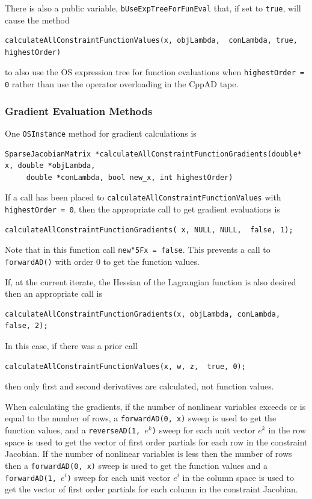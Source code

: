 \documentclass[11pt]{article}
\renewcommand{\_}{{\char"5F}}
\renewcommand{\{}{{\char"7B}}
\renewcommand{\}}{{\char"7D}}
\renewcommand{\^}{{\char"0D}}
\renewcommand{\'}{{\char"0D}}
\begin{document}
\begin{enumerate}[Step 1:]
There is also a public variable, {\tt bUseExpTreeForFunEval} that, if set to {\tt true}, will cause the method
\begin{verbatim}
calculateAllConstraintFunctionValues(x, objLambda,  conLambda, true, highestOrder)
\end{verbatim}
to also use the OS expression tree for function evaluations when {\tt highestOrder = 0} rather than use 
the operator overloading in the CppAD tape.

\subsubsection{Gradient Evaluation Methods}

One {\tt OSInstance} method for gradient calculations is
\begin{verbatim}
SparseJacobianMatrix *calculateAllConstraintFunctionGradients(double* x, double *objLambda,
     double *conLambda, bool new_x, int highestOrder)
\end{verbatim}
If a call has been placed to {\tt calculateAllConstraintFunctionValues} with {\tt highestOrder = 0}, then the appropriate call to get gradient evaluations is
\begin{verbatim}
calculateAllConstraintFunctionGradients( x, NULL, NULL,  false, 1);
\end{verbatim}
Note that in this function call {\tt new\_x = false}. This prevents a call to {\tt forwardAD()} with order 0 to get the function values.


If, at the current iterate, the Hessian of the Lagrangian function is also desired then an appropriate call is
\begin{verbatim}
calculateAllConstraintFunctionGradients(x, objLambda, conLambda, false, 2);
\end{verbatim}
In this case, if there was a prior call
\begin{verbatim}
calculateAllConstraintFunctionValues(x, w, z,  true, 0);
\end{verbatim}
then only first and second derivatives are calculated, not function values.

When calculating the gradients, if the number of nonlinear variables exceeds or is equal  to the number of rows,  a {\tt forwardAD(0, x)} sweep is used to get the function values,  and   a {\tt reverseAD(1, $e^{k}$)}  sweep for each unit vector  $e^{k}$ in the row space  is used to get the vector of first order partials for each row in the constraint Jacobian.  If the number of nonlinear variables is less then the number of rows then a {\tt forwardAD(0, x)} sweep  is used to get the function values and a {\tt forwardAD(1,  $e^{i}$)}  sweep for each unit vector  $e^{i}$ in the column space is used to get the vector of first order partials for each column in the constraint Jacobian.


\end{enumerate}
\end{document}
